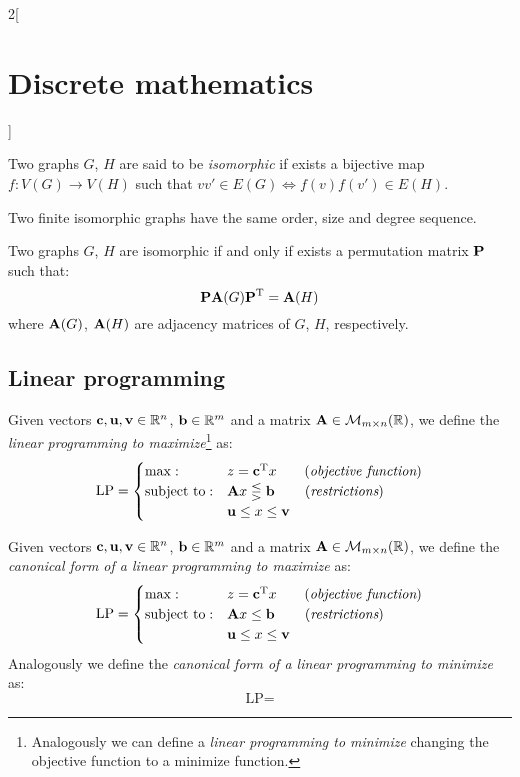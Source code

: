 \documentclass[../../../main_math.tex]{subfiles}
\begin{document}
\begin{multicols}{2}[\section{Discrete mathematics}]
\begin{definition}
    Two graphs $G$, $H$ are said to be \emph{isomorphic} if exists a bijective map $f:V(G)\rightarrow V(H)$ such that $vv'\in E(G)\iff f(v)f(v')\in E(H)$.
  \end{definition}
  \begin{proposition}
    Two finite isomorphic graphs have the same order, size and degree sequence.
  \end{proposition}
  \begin{theorem}
    Two graphs $G$, $H$ are isomorphic if and only if exists a permutation matrix $\boldsymbol{\mathrm{P}}$ such that: $$\boldsymbol{\mathrm{P}}\boldsymbol{\mathrm{A}}(G){\boldsymbol{\mathrm{P}}}^{\mathrm{T}}=\boldsymbol{\mathrm{A}}(H)$$ where $\boldsymbol{\mathrm{A}}(G)$, $\boldsymbol{\mathrm{A}}(H)$ are adjacency matrices of $G$, $H$, respectively.
  \end{theorem}
  \subsection{Linear programming}
  \begin{definition}
    Given vectors $\boldsymbol{\mathrm{c}},\boldsymbol{\mathrm{u}},\boldsymbol{\mathrm{v}}\in\mathbb{R} ^n$, $\boldsymbol{\mathrm{b}}\in\mathbb{R} ^m$ and a matrix $\boldsymbol{\mathrm{A}}\in\mathcal{M}_{m\times n}(\mathbb{R} )$, we define the \emph{linear programming to maximize}\footnote{Analogously we can define a \emph{linear programming to minimize} changing the objective function to a minimize function.} as: $$\text{LP}=
      \begin{cases}
        \max:              & z=\transpose{\vf{c}}x\qquad    (\text{\emph{objective function}}) \\
        \text{subject to}: & \vf{A}x\lesseqgtr \vf{b}\qquad\, (\text{\emph{restrictions}})     \\
                           & \vf{u}\leq x\leq \vf{v}
      \end{cases}$$
  \end{definition}
  \begin{definition}
    Given vectors $\boldsymbol{\mathrm{c}},\boldsymbol{\mathrm{u}},\boldsymbol{\mathrm{v}}\in\mathbb{R} ^n$, $\boldsymbol{\mathrm{b}}\in\mathbb{R} ^m$ and a matrix $\boldsymbol{\mathrm{A}}\in\mathcal{M}_{m\times n}(\mathbb{R} )$, we define the \emph{canonical form of a linear programming to maximize} as: $$\text{LP}=
      \begin{cases}
        \max:              & z=\transpose{\vf{c}}x\qquad   (\text{\emph{objective function}}) \\
        \text{subject to}: & \vf{A}x\leq \vf{b}\qquad\,      (\text{\emph{restrictions}} )    \\
                           & \vf{u}\leq x\leq \vf{v}
      \end{cases}$$
    Analogously we define the \emph{canonical form of a linear programming to minimize} as: $$\text{LP}=
$$
\end{definition}
\end{multicols}
\end{document}

